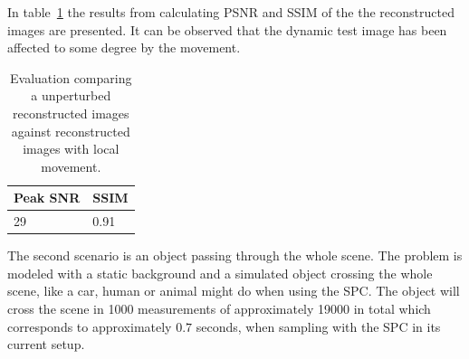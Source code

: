 In table~\ref{tab:local_dyn} the results from calculating PSNR and SSIM of the the reconstructed images are presented. It can be observed that the dynamic test image has been affected to some degree by the movement.

\begin{table}[H]
    \centering
  \begin{tabular}{ | l | l |}
    \hline
    Peak SNR  & SSIM \\ \hline
    29  & 0.91 \\ 
    \hline
  \end{tabular}
      \caption{Evaluation comparing a unperturbed reconstructed images against reconstructed images with local movement.}
    \label{tab:local_dyn}
\end{table}






The second scenario is an object passing through the whole scene. The problem is modeled with a static background and a simulated object crossing the whole scene, like a car, human or animal might do when using the SPC. The object will cross the scene in 1000 measurements of approximately 19000 in total which corresponds to approximately $0.7$ seconds, when sampling with the SPC in its current setup.\\[0.1in]



